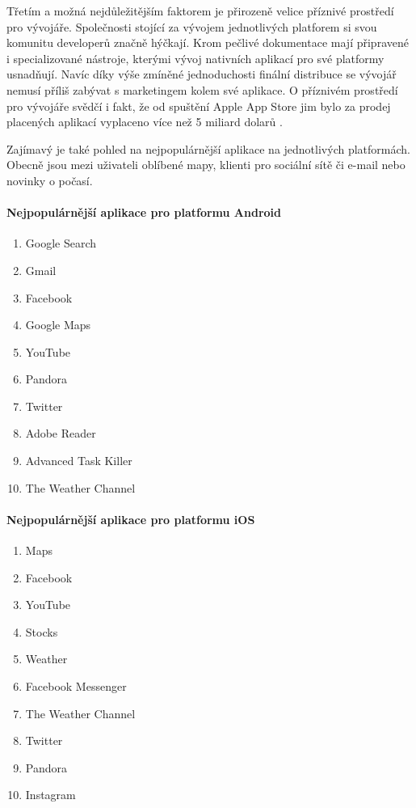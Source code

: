 Třetím a možná nejdůležitějším faktorem je přirozeně velice příznivé prostředí pro vývojáře. Společnosti stojící za vývojem jednotlivých platforem si svou komunitu developerů značně hýčkají. Krom pečlivé dokumentace mají připravené i specializované nástroje, kterými vývoj nativních aplikací pro své platformy usnadňují. Navíc díky výše zmíněné jednoduchosti finální distribuce se vývojář nemusí příliš zabývat s marketingem kolem své aplikace. O příznivém prostředí pro vývojáře svědčí i fakt, že od spuštění Apple App Store jim bylo za prodej placených aplikací vyplaceno více než 5 miliard dolarů \cite{comscore_report_may}.

Zajímavý je také pohled na nejpopulárnější aplikace na jednotlivých platformách. Obecně jsou mezi uživateli oblíbené mapy, klienti pro sociální sítě či e-mail nebo novinky o počasí.

\paragraph{Nejpopulárnější aplikace pro platformu Android \cite{desitka_nej_aplikaci_android}}
\begin{enumerate}
	\item Google Search
	\item Gmail
	\item Facebook
	\item Google Maps
	\item YouTube
	\item Pandora
	\item Twitter
	\item Adobe Reader
	\item Advanced Task Killer
	\item The Weather Channel
\end{enumerate}

\paragraph{Nejpopulárnější aplikace pro platformu iOS \cite{desitka_nej_aplikaci_android}}
\begin{enumerate}
	\item Maps
	\item Facebook
	\item YouTube
	\item Stocks
	\item Weather
	\item Facebook Messenger
	\item The Weather Channel
	\item Twitter
	\item Pandora
	\item Instagram
\end{enumerate}

